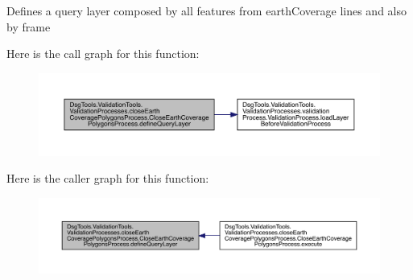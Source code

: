 \begin{DoxyVerb}Defines a query layer composed by all features from earthCoverage lines and also by frame
\end{DoxyVerb}
 Here is the call graph for this function\+:
\nopagebreak
\begin{figure}[H]
\begin{center}
\leavevmode
\includegraphics[width=350pt]{class_dsg_tools_1_1_validation_tools_1_1_validation_processes_1_1close_earth_coverage_polygons_pcbfc5684de655aabbd7cec48624aa747_a3527f99ea8c60d1496deb1c42383e2bc_cgraph}
\end{center}
\end{figure}
Here is the caller graph for this function\+:
\nopagebreak
\begin{figure}[H]
\begin{center}
\leavevmode
\includegraphics[width=350pt]{class_dsg_tools_1_1_validation_tools_1_1_validation_processes_1_1close_earth_coverage_polygons_pcbfc5684de655aabbd7cec48624aa747_a3527f99ea8c60d1496deb1c42383e2bc_icgraph}
\end{center}
\end{figure}
\mbox{\label{class_dsg_tools_1_1_validation_tools_1_1_validation_processes_1_1close_earth_coverage_polygons_pcbfc5684de655aabbd7cec48624aa747_aa31b4fa53d1ebc98e42f3af6d5e4df2f}} 
